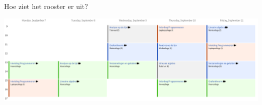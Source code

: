 \documentclass{beamer}
\begin{document}
\begin{frame}{Hoe ziet het rooster er uit?}
    \begin{center}
        \includegraphics[width=\textwidth]{rooster.png}
    \end{center}
\end{frame}
\end{document}
